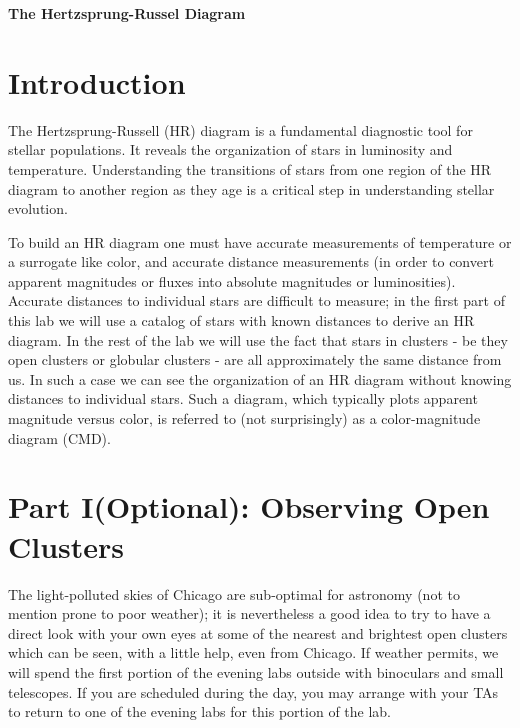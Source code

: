 \documentclass[12pt]{article}
\begin{document}
\vspace*{-.7in}
\vspace{.7in}
\centerline{\large\bf The Hertzsprung-Russel Diagram}
\vspace{.2in}

\section*{Introduction}

The Hertzsprung-Russell (HR) diagram is a fundamental diagnostic tool
for stellar populations.  It reveals the organization of stars in
luminosity and temperature. Understanding the transitions of stars
from one region of the HR diagram to another region as they age is a
critical step in understanding stellar evolution.

To build an HR diagram one must have accurate measurements of
temperature or a surrogate like color, and
accurate distance measurements (in order to convert apparent
magnitudes or fluxes into absolute magnitudes or
luminosities). Accurate distances to individual stars are difficult to
measure; in the first part of this lab we will use a catalog of stars with known distances to derive an HR diagram. In the rest of the lab we will use the fact that stars in clusters - be
they open clusters or globular clusters - are all approximately the same
distance from us. In such a case we can see the organization of an HR diagram
without knowing distances to individual stars. Such a diagram, which
typically plots apparent magnitude versus color, is referred to (not
surprisingly) as a color-magnitude diagram (CMD).


\section*{Part I(Optional): Observing Open Clusters}
The light-polluted skies of Chicago are sub-optimal for astronomy (not
to mention prone to poor weather); it is nevertheless a good idea to
try to have a direct look with your own eyes at some of the nearest and
brightest open clusters which can be seen, with a little help, even from
Chicago.  If weather permits, we will spend the first portion of the
evening labs outside with binoculars and small telescopes. If you are
scheduled during the day, you may arrange with your TAs to return to
one of the evening labs for this portion of the lab.
\end{document}
